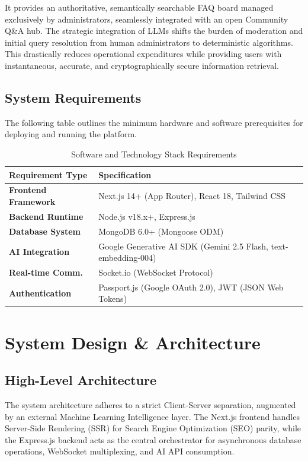 \documentclass[12pt,a4paper]{article}
\begin{document}
It provides an authoritative, semantically searchable FAQ board managed exclusively by administrators, seamlessly integrated with an open Community Q\&A hub. The strategic integration of LLMs shifts the burden of moderation and initial query resolution from human administrators to deterministic algorithms. This drastically reduces operational expenditures while providing users with instantaneous, accurate, and cryptographically secure information retrieval.

\subsection{System Requirements}
The following table outlines the minimum hardware and software prerequisites for deploying and running the platform.

\vspace{0.5cm}
\begin{table}[h]
\centering
\renewcommand{\arraystretch}{1.5}
\begin{tabularx}{\textwidth}{@{} l X @{}}
\toprule
\textbf{Requirement Type} & \textbf{Specification} \\
\midrule
\textbf{Frontend Framework} & Next.js 14+ (App Router), React 18, Tailwind CSS \\
\textbf{Backend Runtime} & Node.js v18.x+, Express.js \\
\textbf{Database System} & MongoDB 6.0+ (Mongoose ODM) \\
\textbf{AI Integration} & Google Generative AI SDK (Gemini 2.5 Flash, text-embedding-004) \\
\textbf{Real-time Comm.} & Socket.io (WebSocket Protocol) \\
\textbf{Authentication} & Passport.js (Google OAuth 2.0), JWT (JSON Web Tokens) \\
\bottomrule
\end{tabularx}
\caption{Software and Technology Stack Requirements}
\end{table}

\newpage

\section{System Design \& Architecture}
\vspace{0.5cm}

\subsection{High-Level Architecture}
The system architecture adheres to a strict Client-Server separation, augmented by an external Machine Learning Intelligence layer. The Next.js frontend handles Server-Side Rendering (SSR) for Search Engine Optimization (SEO) parity, while the Express.js backend acts as the central orchestrator for asynchronous database operations, WebSocket multiplexing, and AI API consumption.
\end{document}

